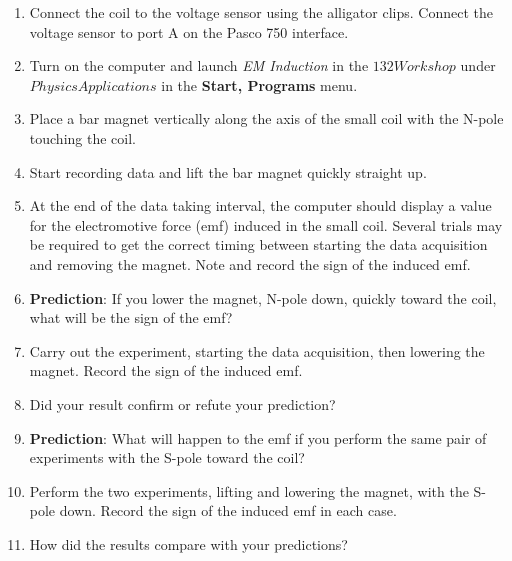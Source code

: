 \begin{enumerate}
\item Connect the coil to the voltage sensor using the alligator clips. Connect the voltage sensor to port A on the Pasco 750 interface.
\item Turn on the computer and launch {\it EM Induction} in the $132 Workshop$ 
under $Physics Applications$ in the {\bf Start, Programs} menu.

\item Place a bar magnet vertically along the axis of the small coil with
the N-pole touching the coil.

\item Start recording data and lift the bar magnet quickly straight up.

\item At the end of the data taking interval, the computer should display
a value for the electromotive force (emf) induced in the small coil.
Several trials may be required to get the correct timing between starting
the data acquisition and removing the magnet. Note and record the sign of the 
induced emf.\vspace{10mm}

\item \textbf{Prediction}: If you lower the magnet, N-pole down, quickly
toward the coil, what will be the sign of the emf? \vspace{15mm}

\item Carry out the experiment, starting the data acquisition, then lowering the magnet.
Record the sign of the induced emf.\vspace{10mm}

\item Did your result confirm or refute your prediction?\vspace{20mm}

\item \textbf{Prediction}: What will happen to the emf if you perform the
same pair of experiments with the S-pole toward the coil? \vspace{20mm}

\item Perform the two experiments, lifting and lowering the magnet, with
the S-pole down. Record the sign of the induced emf in each case.\vspace{20mm}

\item How did the results compare with your predictions?

\end{enumerate}
